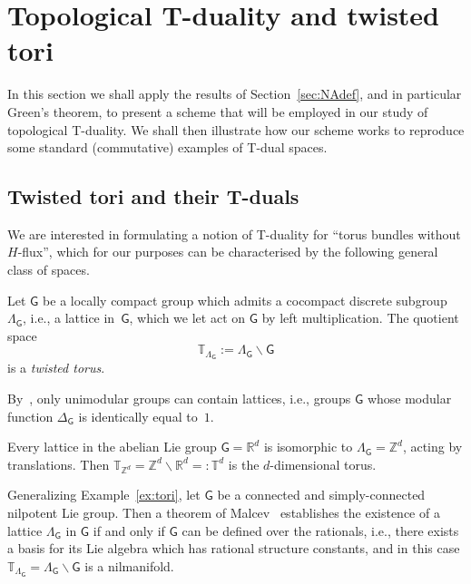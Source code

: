 \documentclass[10pt,a4paper]{amsart}
\numberwithin{equation}{section}
\newcommand{\sfG}{\mathsf{G}}
\newcommand{\zed}{{\mathbb Z}} %
\newcommand{\real}{{\mathbb R}} %
\newcommand{\torus}{{\mathbb T}} %
\begin{document}
\section{Topological T-duality and twisted tori}\label{sec:TopTtorus}

In this section we shall apply the results of Section~\ref{sec:NAdef}, and in particular
Green's theorem, to present a scheme
that will be employed in our study of topological T-duality. We shall
then illustrate how our scheme works to reproduce some standard
(commutative) examples of T-dual spaces.

\subsection{Twisted tori and their T-duals}\label{sec:twistedtori}

We are interested in formulating a notion of T-duality for
``torus bundles without $H$-flux'', which for our purposes can be
characterised by the following general class of spaces.

\begin{Definition}
Let $\sfG$ be a locally compact group which admits a
cocompact discrete subgroup $\Lambda_\sfG$, i.e., a lattice in~$\sfG$, which we let act on $\sfG$ by left
multiplication. The quotient space
\[
\torus_{\Lambda_\sfG}:=\Lambda_\sfG\backslash \sfG
\]
is a \emph{twisted torus}.
\end{Definition}

By~\cite[Lemma~6.2]{Milnor1976}, only unimodular groups can contain lattices, i.e., groups $\sfG$ whose
modular function $\Delta_\sfG$ is identically equal to~$1$.

\begin{Example}[tori]\label{ex:tori}
Every lattice in the abelian Lie group $\sfG=\real^d$ is
isomorphic to $\Lambda_\sfG=\zed^d$, acting by translations. Then
$\torus_{\zed^d}=\zed^d\backslash\real^d=:\torus^d$ is the $d$-dimensional torus.
\end{Example}

\begin{Example}[nilmanifolds]\label{ex:nilmanifolds}
Generalizing Example~\ref{ex:tori}, let $\sfG$ be a connected and simply-connected nilpotent Lie group. Then a theorem of
Malcev~\cite[Theorem~2.12]{Raghunathan1972} establishes the existence
of a lattice $\Lambda_\sfG$ in $\sfG$ if and only if
$\sfG$ can be defined over the rationals,
i.e., there exists a basis for its Lie algebra which has rational
structure constants, and in this case $\torus_{\Lambda_\sfG}=\Lambda_\sfG\backslash \sfG$ is a nilmanifold.
\end{Example}
\end{document}
